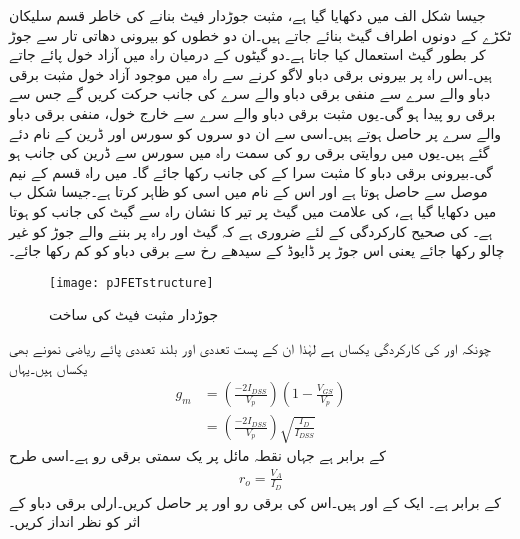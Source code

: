 جیسا شکل  الف میں دکھایا گیا ہے، مثبت جوڑدار فیٹ بنانے کی خاطر  قسم سلیکان ٹکڑے کے دونوں اطراف  گیٹ بنائے جاتے ہیں۔ان دو خطوں کو بیرونی دھاتی تار سے جوڑ کر بطور  گیٹ  استعمال کیا جاتا ہے۔دو گیٹوں کے درمیان راہ میں آزاد خول پائے جاتے ہیں۔اس راہ پر بیرونی برقی دباو  لاگو کرنے سے راہ میں موجود آزاد خول مثبت برقی دباو والے سرے سے منفی برقی دباو والے سرے کی جانب حرکت کریں گے جس سے برقی رو  پیدا ہو گی۔یوں مثبت برقی دباو والے سرے سے خارج خول، منفی برقی دباو والے سرے پر حاصل ہوتے ہیں۔اسی سے ان دو سروں کو سورس  اور ڈرین  کے نام دئے گئے ہیں۔یوں  میں روایتی برقی رو کی سمت راہ میں سورس سے ڈرین کی جانب ہو گی۔بیرونی برقی دباو کا مثبت سرا  کے  کی جانب رکھا جائے گا۔ میں راہ  قسم کے نیم موصل سے حاصل ہوتا ہے اور اس کے نام میں  اسی  کو ظاہر کرتا ہے۔جیسا شکل  ب میں دکھایا گیا ہے،  کی علامت میں گیٹ پر تیر کا نشان راہ سے گیٹ کی جانب کو ہوتا ہے۔ کی صحیح کارکردگی کے لئے ضروری ہے کہ گیٹ اور راہ پر بننے والے  جوڑ کو غیر چالو رکھا جائے یعنی اس جوڑ پر ڈایوڈ کے سیدھے رخ  سے برقی دباو کو کم رکھا جائے۔
\begin{figure}
\centering
\texttt{[image: pJFETstructure]}
\caption{جوڑدار مثبت فیٹ کی ساخت}
\label{شکل_جوڑدار_مثبت_فیٹ_ساخت}
\end{figure}
چونکہ  اور  کی کارکردگی یکساں ہے لہٰذا ان کے پست تعددی اور بلند تعددی پائے ریاضی نمونے بھی یکساں ہیں۔یہاں
\begin{align} \label{مساوات_افزائش_فیٹ}
g_m &=\left(\frac{-2  I_{DSS}}{V_p} \right) \left(1-\frac{V_{GS}}{V_p} \right) \\
&=\left(\frac{-2  I_{DSS}}{V_p} \right)  \sqrt{\frac{I_D}{I_{DSS}}}
\end{align} 
کے برابر ہے جہاں  نقطہ مائل پر یک سمتی برقی رو ہے۔اسی طرح
\begin{align}
r_o=\frac{V_A}{I_D}
\end{align} 
کے برابر ہے۔
ایک  کے  اور  ہیں۔اس کی برقی رو  اور  پر حاصل کریں۔ارلی برقی دباو کے اثر کو نظر انداز کریں۔

